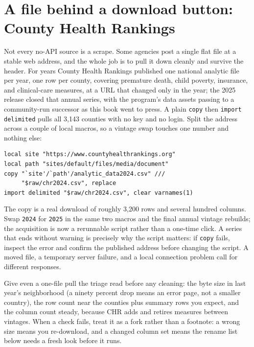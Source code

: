 \documentclass[
    a4paper,
    fontsize=10pt,
    twoside=true,
    numbers=noenddot,
]{kaobook}
\begin{document}
\section{A file behind a download button: County Health Rankings}\label{sec:chr}
Not every no-API source is a scrape. Some agencies post a single flat file at a stable web address, and the whole job is to pull it down cleanly and survive the header. For years County Health Rankings published one national analytic file per year, one row per county, covering premature death, child poverty, insurance, and clinical-care measures, at a URL that changed only in the year; the 2025 release closed that annual series, with the program's data assets passing to a community-run successor as this book went to press. A plain \texttt{copy} then \texttt{import delimited} pulls all 3{,}143 counties with no key and no login. Split the address across a couple of local macros, so a vintage swap touches one number and nothing else:
\par
{\footnotesize
\begin{verbatim}
local site "https://www.countyhealthrankings.org"
local path "sites/default/files/media/document"
copy "`site'/`path'/analytic_data2024.csv" ///
     "$raw/chr2024.csv", replace
import delimited "$raw/chr2024.csv", clear varnames(1)
\end{verbatim}
}
The copy is a real download of roughly 3{,}200 rows and several hundred columns. Swap \texttt{2024} for \texttt{2025} in the same two macros and the final annual vintage rebuilds; the acquisition is now a rerunnable script rather than a one-time click. A series that ends without warning is precisely why the script matters: if \texttt{copy} fails, inspect the error and confirm the published address before changing the script. A moved file, a temporary server failure, and a local connection problem call for different responses.

Give even a one-file pull the triage read before any cleaning: the byte size in last year's neighborhood (a ninety percent drop means an error page, not a smaller country), the row count near the counties plus summary rows you expect, and the column count steady, because CHR adds and retires measures between vintages. When a check fails, treat it as a fork rather than a footnote: a wrong size means you re-download, and a changed column set means the rename list below needs a fresh look before it runs.
\end{document}
